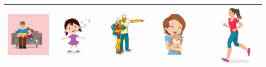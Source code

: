 \documentclass[12pt,notitlepage]{article}
\begin{document}
\begin{center}
\begin{tabular}{|c||c||c||c||c|}
\includegraphics[width=0.16\columnwidth]{square/I26.jpg} &  \includegraphics[width=0.16\columnwidth]{square/I27.jpg} & \includegraphics[width=0.16\columnwidth]{square/I28.jpg} & \includegraphics[width=0.16\columnwidth]{square/I29.jpg} &  \includegraphics[width=0.16\columnwidth]{square/I30.jpg} \\
\hline
\end{tabular}
\vspace{1em} \\
\end{center}
\end{document}
